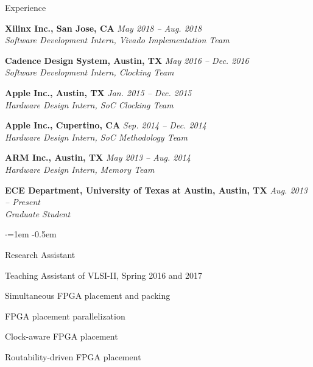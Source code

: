 
\begin{rSection}{Experience}


{\bf Xilinx Inc., San Jose, CA} \hfill {\em May 2018 -- Aug. 2018} \\
\textit{Software Development Intern, Vivado Implementation Team}
    
{\bf Cadence Design System, Austin, TX} \hfill {\em May 2016 -- Dec. 2016} \\
\textit{Software Development Intern, Clocking Team}

{\bf Apple Inc., Austin, TX} \hfill {\em Jan. 2015 -- Dec. 2015} \\
\textit{Hardware Design Intern, SoC Clocking Team}

{\bf Apple Inc., Cupertino, CA} \hfill {\em Sep. 2014 -- Dec. 2014} \\
\textit{Hardware Design Intern, SoC Methodology Team}

{\bf ARM Inc., Austin, TX} \hfill {\em May 2013 -- Aug. 2014} \\
\textit{Hardware Design Intern, Memory Team}

{\bf ECE Department, University of Texas at Austin, Austin, TX} \hfill {\em Aug. 2013 -- Present} \\
\textit{Graduate Student}
\begin{list}{$\cdot$}{\leftmargin=1em} %
\itemsep -0.5em \vspace{-0.5em} %
\item Research Assistant
\item Teaching Assistant of VLSI-II, Spring 2016 and 2017
\item Simultaneous FPGA placement and packing
\item FPGA placement parallelization
\item Clock-aware FPGA placement
\item Routability-driven FPGA placement
\end{list}

\end{rSection}


